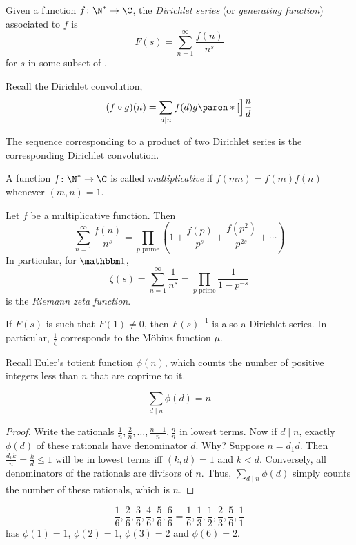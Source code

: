 \begin{definition*} \label{def:dirichlet_series}
    Given a function $f\colon \N^* \to \C$, the \emph{Dirichlet series}
    (or \emph{generating function}) associated to $f$ is \[
        F(s) = \sum_{n=1}^\infty \frac{f(n)}{n^s}
    \] for $s$ in some subset of \C.
\end{definition*}
Recall the Dirichlet convolution, \[
    (f \circ g)(n) = \sum_{d \mid n} f(d)g\paren*[\Big]{\frac{n}{d}}
\]
\begin{exercise}
    The sequence corresponding to a product of two Dirichlet series is the
    corresponding Dirichlet convolution.
\end{exercise}

\begin{definition*}[Multiplicative] \label{def:multiplicative}
    A function $f\colon \N^* \to \C$ is called \emph{multiplicative} if
    $f(mn) = f(m)f(n)$ whenever $(m, n) = 1$.
\end{definition*}
\begin{fact}
    Let $f$ be a multiplicative function.
    Then \[
        \sum_{n=1}^\infty \frac{f(n)}{n^s}
        = \prod_{p \text{ prime}} \left(1 + \frac{f(p)}{p^s} + \frac{f(p^2)}{p^{2s}} + \cdots\right)
    \] In particular, for $\mathbbm 1$, \[
        \zeta(s) = \sum_{n=1}^\infty \frac{1}{n^s}
        = \prod_{p \text{ prime}} \frac{1}{1 - p^{-s}}
    \] is the \emph{Riemann zeta function}.
\end{fact}

If $F(s)$ is such that $F(1) \ne 0$, then $F(s)^{-1}$ is also a Dirichlet
series.
In particular, $\frac1{\zeta}$ corresponds to the Möbius function $\mu$.

Recall Euler's totient function $\phi(n)$, which counts the number of
positive integers less than $n$ that are coprime to it.
\begin{proposition*} \label{thm:totient:sum}
    \[
        \sum_{d \mid n} \phi(d) = n
    \]
\end{proposition*}
\begin{proof}
    Write the rationals $\frac1n, \frac{2}{n}, \dots,
    \frac{n-1}{n}, \frac{n}{n}$ in lowest terms.
    Now if $d \mid n$, exactly $\phi(d)$ of these rationals have
    denominator $d$.
    Why? Suppose $n = d_1 d$.
    Then $\frac{d_1 k}{n} = \frac{k}{d} \le 1$ will be in lowest terms iff
    $(k, d) = 1$ and $k < d$.
    Conversely, all denominators of the rationals are divisors of $n$.
    Thus, $\sum_{d \mid n} \phi(d)$ simply counts the number of these
    rationals, which is $n$.
\end{proof}
\begin{example}
    \[
        \frac16, \frac26, \frac36, \frac46, \frac56, \frac66
        = \frac16, \frac13, \frac12, \frac23, \frac56, \frac11
    \] has $\phi(1) = 1$, $\phi(2) = 1$, $\phi(3) = 2$ and $\phi(6) = 2$.
\end{example}

